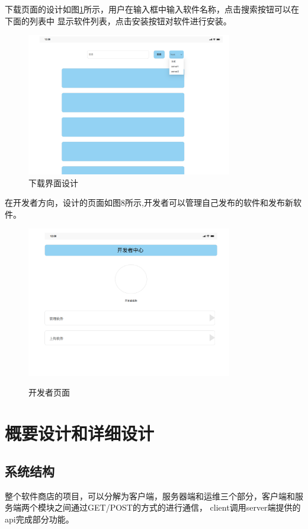 \documentclass[supercite]{Experimental_Report}
\theoremstyle{definition}
\begin{document}
\newpage
下载页面的设计如图\ref{download}所示，用户在输入框中输入软件名称，点击搜索按钮可以在下面的列表中
显示软件列表，点击安装按钮对软件进行安装。
\begin{figure}[!h]
    \centering
    \includegraphics[width=0.8\textwidth]{./images/download.png}
    \caption{下载界面设计}
    \label{download}
\end{figure}

\newpage
在开发者方向，设计的页面如图8所示,开发者可以管理自己发布的软件和发布新软件。
\begin{figure}[!h]
    \caption{开发者页面}
    \centering
    \includegraphics[width=0.8\textwidth]{./images/develop.png}
	\label{develop}
\end{figure}

\newpage
\section{概要设计和详细设计}
\subsection{系统结构}
整个软件商店的项目，可以分解为客户端，服务器端和运维三个部分，客户端和服务端两个模块之间通过GET/POST的方式的进行通信，
client调用server端提供的api完成部分功能。
\end{document}
